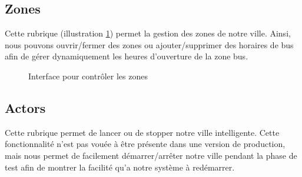 \subsection{Zones}
Cette rubrique (illustration \ref{senseurs}) permet la gestion des zones de notre ville. Ainsi, nous pouvons ouvrir/fermer des zones ou ajouter/supprimer des horaires de bus afin de gérer dynamiquement les heures d’ouverture de la zone bus.
\begin{figure}[H]
    \begin{center}
        \caption{Interface pour contrôler les zones}\label{senseurs}
    \end{center}
\end{figure}

\subsection{Actors}
Cette rubrique permet de lancer ou de stopper notre ville intelligente. Cette fonctionnalité n’est pas vouée à être présente dans une version de production, mais nous permet de facilement démarrer/arrêter notre ville pendant la phase de test afin de montrer la facilité qu’a notre système à redémarrer.

